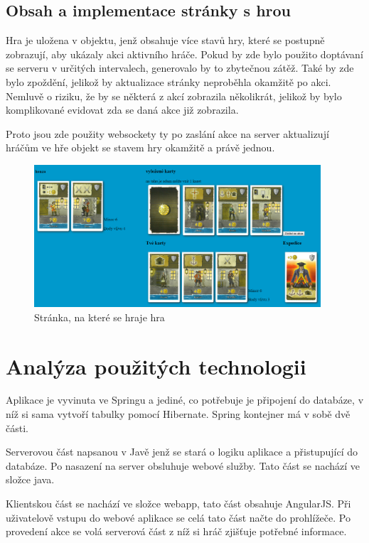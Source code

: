 \documentclass[czech,master,public,dept460,male,cpdeclaration,twoside]{diploma}
\begin{document}
\subsection{Obsah a implementace stránky s hrou}
Hra je uložena v objektu, jenž obsahuje více stavů hry, které se postupně zobrazují, aby ukázaly akci aktivního hráče.
Pokud by zde bylo použito doptávaní se serveru v určitých intervalech, generovalo by to zbytečnou zátěž. Také by zde bylo zpoždění, jelikož by aktualizace stránky neproběhla okamžitě po akci. Nemluvě o riziku, že by se některá z akcí zobrazila několikrát, jelikož by bylo komplikované evidovat zda se daná akce již zobrazila.

Proto jsou zde použity websockety ty po zaslání akce na server aktualizují hráčům ve hře objekt se stavem hry okamžitě a právě jednou.
\begin{figure}[H]
\centering\includegraphics[width=0.95\textwidth]{Figures/gamepage.png}\caption{Stránka, na které se hraje hra}
\end{figure}


\section{Analýza použitých technologii}
Aplikace je vyvinuta ve Springu a jediné, co potřebuje je připojení do databáze, v níž si sama vytvoří tabulky pomocí Hibernate. Spring kontejner má v sobě dvě části.

Serverovou část napsanou v Javě jenž se stará o logiku aplikace a přistupující do databáze. Po nasazení na server obsluhuje webové služby. Tato část se nachází ve složce java. 

Klientskou část se nachází ve složce webapp, tato část obsahuje AngularJS. Při uživatelově vstupu do webové aplikace se celá tato část načte do prohlížeče. Po provedení akce se volá serverová část z níž si hráč zjišťuje potřebné informace.
\end{document}
